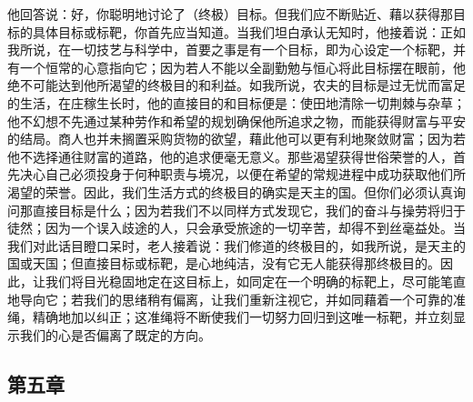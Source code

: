 \par

他回答说：好，你聪明地讨论了（终极）目标。但我们应不断贴近、藉以获得那目标的具体目标或标靶，你首先应当知道。当我们坦白承认无知时，他接着说：正如我所说，在一切技艺与科学中，首要之事是有一个目标，即为心设定一个标靶，并有一个恒常的心意指向它；因为若人不能以全副勤勉与恒心将此目标摆在眼前，他绝不可能达到他所渴望的终极目的和利益。如我所说，农夫的目标是过无忧而富足的生活，在庄稼生长时，他的直接目的和目标便是：使田地清除一切荆棘与杂草；他不幻想不先通过某种劳作和希望的规划确保他所追求之物，而能获得财富与平安的结局。商人也并未搁置采购货物的欲望，藉此他可以更有利地聚敛财富；因为若他不选择通往财富的道路，他的追求便毫无意义。那些渴望获得世俗荣誉的人，首先决心自己必须投身于何种职责与境况，以便在希望的常规进程中成功获取他们所渴望的荣誉。因此，我们生活方式的终极目的确实是天主的国。但你们必须认真询问那直接目标是什么；因为若我们不以同样方式发现它，我们的奋斗与操劳将归于徒然；因为一个误入歧途的人，只会承受旅途的一切辛苦，却得不到丝毫益处。当我们对此话目瞪口呆时，老人接着说：我们修道的终极目的，如我所说，是天主的国或天国；但直接目标或标靶，是心地纯洁，没有它无人能获得那终极目的。因此，让我们将目光稳固地定在这目标上，如同定在一个明确的标靶上，尽可能笔直地导向它；若我们的思绪稍有偏离，让我们重新注视它，并如同藉着一个可靠的准绳，精确地加以纠正；这准绳将不断使我们一切努力回归到这唯一标靶，并立刻显示我们的心是否偏离了既定的方向。\par


\subsection{第五章}

\par

